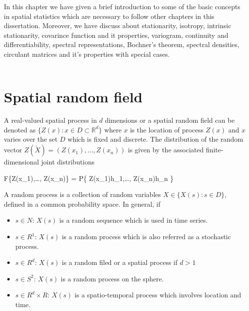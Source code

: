 
In this chapter we have given a brief introduction to some of the basic concepts in spatial statistics which are necessary to follow other chapters in this dissertation. Moreover, we have discuss about stationarity, isotropy, intrinsic stationarity, covarince function and it properties, variogram, continuity and differentiability, spectral representations, Bochner's theorem, spectral densities, circulant matrices and it's properties with special cases.\\~\\


\section{Spatial random field} 

A real-valued spatial process in $d$ dimensions or a spatial random field can be denoted as $\{Z(x): x \in D \subset \mathbb{R}^d\}$ where $x$ is the location of process $Z(x)$ and $x$ varies over the set $D$ which is fixed and discrete. The distribution of the random vector $ Z(\utilde{X})=(Z(x_1),\ldots, Z(x_n) )$ is given by the associated finite-dimensional joint distributions

\beq
F\{Z(x_1),\ldots, Z(x_n)\} = P\{ Z(x_1)\le h_1,\ldots, Z(x_n)\le h_n \} 
\eeq

A random process is a collection of random variables $X \in \{X(s): s\in D\}$, defined in a common probability space. In general, if
\begin{itemize}
	\item $s \in N$: $X(s)$ is a random sequence which is used in time series.
	\item $s \in R^1$: $X(s)$ is a random process which is also referred as a stochastic process.
	\item $s \in R^d$: $X(s)$ is a random filed or a spatial process if $d > 1$
	\item $s \in S^2$: $X(s)$ is a random process on the sphere.
	\item $s \in R^d\times R$: $X(s)$ is a spatio-temporal process which involves location and time.
\end{itemize}


